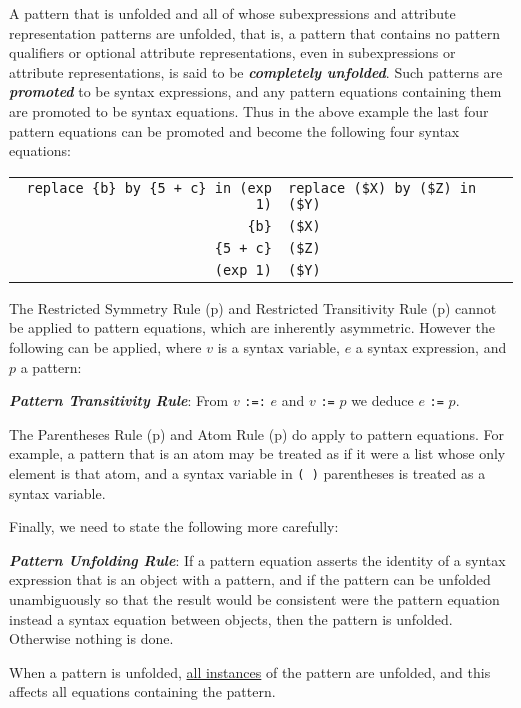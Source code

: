 \documentclass[12pt]{article}
\newcommand{\key}[1]{{\bf \em #1}\index{#1}}
\newcommand{\ikey}[2]{{\bf \em #1}\index{#2}}
\newcommand{\pagref}[1]{p\pageref{#1}}
\newcommand{\TILDE}{\usebox{\TILDEBOX}}
\newenvironment{indpar}[1][0.3in]%
	{\begin{list}{}%
		     {\setlength{\itemsep}{0in}%
		      \setlength{\topsep}{0in}%
		      \setlength{\parsep}{1ex}%
		      \setlength{\labelwidth}{#1}%
		      \setlength{\leftmargin}{#1}%
		      \addtolength{\leftmargin}{\labelsep}}%
	 \item}%
	{\end{list}}
\begin{document}
A pattern that is unfolded and all of whose subexpressions
and attribute representation patterns are
unfolded, that is, a pattern that contains no pattern qualifiers or
optional attribute representations,
even in subexpressions or attribute representations,
is said to be \key{completely unfolded}.
Such patterns are \key{promoted} to be syntax expressions, and
any pattern equations containing them are promoted to be
syntax equations.  Thus in the above example the last four
pattern equations can be promoted and become the following
four syntax equations:

\begin{center}
\begin{tabular}{r@{\tt ~:=:~}l}
\verb/replace {b} by {5 + c} in (exp 1)/
	& \verb/replace ($X) by ($Z) in ($Y)/ \\
\verb/{b}/ & \verb/($X)/ \\
\verb/{5 + c}/ & \verb/($Z)/ \\
\verb/(exp 1)/ & \verb/($Y)/ \\
\end{tabular}
\end{center}

The Restricted Symmetry Rule (\pagref{RESTRICTED-SYMMETRY-RULE})
and Restricted Transitivity Rule (\pagref{RESTRICTED-TRANSITIVITY-RULE})
cannot be applied to pattern equations, which are inherently asymmetric.
However the following can be applied, where $v$ is a syntax variable, $e$
a syntax expression, and $p$ a pattern:

\begin{indpar}
\begin{list}{}{}
\item [\ikey{Pattern Transitivity Rule}{pattern transitivity rule}:]%
\label{PATTERN-TRANSITIVITY-RULE}
From $v$ {\tt :=:} $e$ and $v$ {\tt :=\TILDE} $p$
we deduce $e$ {\tt :=\TILDE} $p$.
\end{list}
\end{indpar}

The Parentheses Rule (\pagref{PARENTHESES-RULE})
and Atom Rule (\pagref{ATOM-RULE}) do apply to pattern equations.
For example, a pattern that is an atom may be treated as if it were
a list whose only element is that atom, and a syntax variable in
\verb|( )| parentheses is treated as a syntax variable.

Finally, we need to state the following more carefully:

\begin{indpar}
\begin{list}{}{}
\item [\ikey{Pattern Unfolding Rule}{pattern unfolding rule}:]%
\label{PATTERN-UNFOLDING-RULE}
If a pattern equation asserts the identity of a syntax expression that
is an object with a pattern, and if the pattern can be unfolded unambiguously
so that the result would be consistent were the pattern equation
instead a syntax equation between
objects, then the pattern is unfolded.  Otherwise nothing is done.

When a pattern is unfolded, \underline{all instances} of the pattern
are unfolded, and this affects all equations containing the pattern.
\end{list}
\end{indpar}
\end{document}
